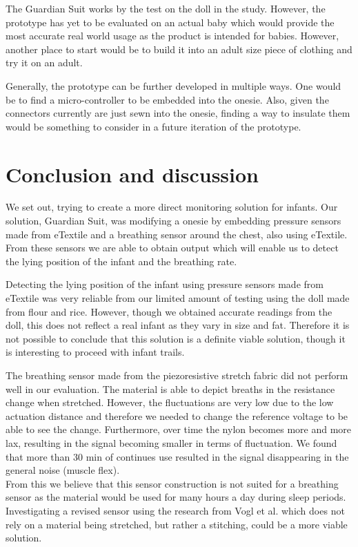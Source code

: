 \documentclass{sigchi-ext}
\begin{document}
The Guardian Suit works by the test on the doll in the study. However,
the prototype has yet to be evaluated on an actual baby which would provide the
most accurate real world usage as the product is intended for babies. However,
another place to start would be to build it into an adult size piece of clothing
and try it on an adult.

Generally, the prototype can be further developed in multiple ways. One would be to 
find a micro-controller to be embedded into the onesie. Also, given the connectors currently are just
sewn into the onesie, finding a way to insulate them would be something to consider in a future
iteration of the prototype.

\section{Conclusion and discussion}
We set out, trying to create a more direct monitoring solution for infants. Our solution, Guardian Suit, was 
modifying a onesie by embedding pressure sensors made from eTextile and a breathing sensor around the
chest, also using eTextile. From these sensors we are able to obtain output which will enable us to 
detect the lying position of the infant and the breathing rate.

Detecting the lying position of the infant using pressure sensors made from eTextile was very reliable from our limited amount of 
testing using the doll made from flour and rice. However, though we obtained accurate readings from the doll, this does not 
reflect a real infant as they vary in size and fat. Therefore it is not possible to conclude that this solution is a definite viable
solution, though it is interesting to proceed with infant trails.

The breathing sensor made from the piezoresistive stretch fabric did not perform well in our evaluation. The material
is able to depict breaths in the resistance change when stretched. However, the fluctuations are very low due to the 
low actuation distance and therefore we needed to change the reference voltage to be able to see the change. Furthermore, 
over time the nylon becomes more and more lax, resulting in the signal
becoming smaller in terms of fluctuation. We found that more than 30 min of continues use resulted in the signal
disappearing in the general noise (muscle flex).\\
From this we believe that this sensor construction is not suited for a breathing sensor as the material would be
used for many hours a day during sleep periods. Investigating a revised sensor using the research from Vogl et al. \cite{stretcheband}
which does not rely on a material being stretched, but rather a stitching, could be a more viable solution.
\end{document}
